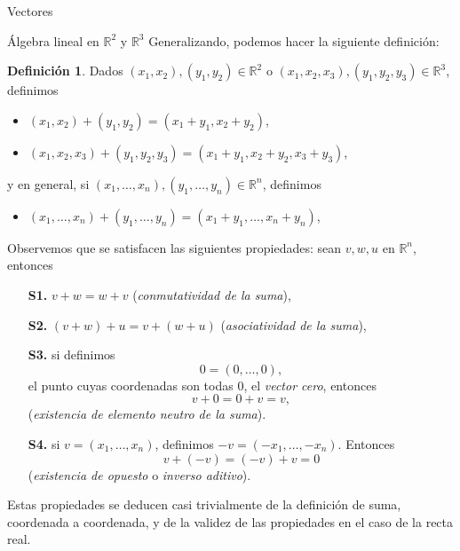 \documentclass[a4paper,12pt,twoside,spanish]{amsbook}
\theoremstyle{definition}
\newtheorem{definicion}{Definici\'on}[section]
\theoremstyle{remark}
\newcommand{\R}{\mathbb R}
\begin{document}
\begin{chapter}{Vectores}
\begin{section}{Álgebra lineal en $\R^2$ y $\R^3$}
		Generalizando, podemos hacer la siguiente definición:
			\begin{definicion}
				Dados $(x_1,x_2), (y_1,y_2) \in \R^2$ o $(x_1,x_2,x_3), (y_1,y_2,y_3) \in \R^3$, definimos
				\begin{itemize}
					\item $(x_1,x_2)+ (y_1,y_2)=(x_1+y_1,x_2+y_2)$, 
					\item $(x_1,x_2,x_3)+ (y_1,y_2,y_3)=(x_1+y_1,x_2+y_2,x_3+y_3)$, 
				\end{itemize}
				y en general, si $(x_1,\ldots,x_n), (y_1,\ldots,y_n) \in \R^n$, definimos 
					\begin{itemize}
					\item $(x_1,\ldots,x_n)+ (y_1,\ldots,y_n)=(x_1+y_1,\ldots,x_n+y_n)$, 
				\end{itemize}
			\end{definicion}
			
		Observemos que se satisfacen las siguientes propiedades: sean $v,w,u$ en $\R^n$,  entonces
		\begin{enumerate}
		\item[\textbf{S1.}] $v + w = w + v$ (\textit{conmutatividad de la suma}),
		\item[\textbf{S2.}] $(v+ w)+ u = v + (w+u)$ (\textit{asociatividad de la suma}),
		\item[\textbf{S3.}] si definimos
		\begin{equation*}
		0 = (0,\dots,0),
		\end{equation*}
		el punto cuyas coordenadas son todas $0$, el \textit{vector cero}, entonces 
			\begin{equation*}
		v +0 = 0 +v = v,
		\end{equation*}
		 (\textit{existencia de elemento neutro de la suma}).
		\item[\textbf{S4.}]si $v = (x_1,\ldots,x_n)$,  definimos $-v = (-x_1,\ldots, -x_n)$. Entonces 
		\begin{equation*}
		v + (-v) = (-v) + v = 0
		\end{equation*} 
		(\textit{existencia de opuesto} o  \textit{inverso aditivo}).
	\end{enumerate}


	Estas propiedades se deducen casi trivialmente de la definición de suma, coordenada a coordenada, y de la validez de las propiedades en el caso de la recta real. 
	
	
	
	
	

\end{section}
\end{chapter}
\end{document}
